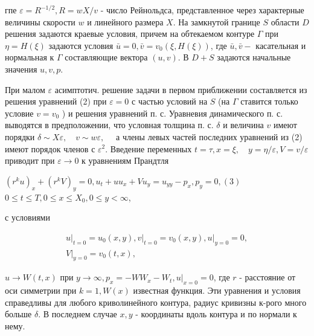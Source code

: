 \documentclass[10pt]{article}
\begin{document}
гпе $\varepsilon=R^{-1 / 2}, R=w X / v$ - число Рейнольдса, представленное через характерные величины скорости $w$ и линейного размера $X$. На замкнутой границе $S$ области $D$ решения задаются краевые условия, причем на обтекаемом контуре $\Gamma$ при $\eta=H(\xi)$ задаются условия $\bar{u}=0, \bar{v}=v_{0}(\xi, H(\xi))$, где $\bar{u}, \bar{v}-$ касательная и нормальная к $\Gamma$ составляющие вектора $(u, v)$. В $D+S$ задаются начальные значения $u, v, p$.



При малом $\varepsilon$ асимптотич. решение задачи в первом приближении составляется из решения уравнений (2) при $\varepsilon=0$ с частью условий на $S$ (на $\Gamma$ ставится только условие $v=v_{0}$ ) и решения уравнений п. с. Уравневия динамического п. с. выводятся в предположении, что условная толщина п. с. $\delta$ и величина $v$ имеют порядки $\delta \sim X \varepsilon, \quad v \sim w \varepsilon, \quad$ а члены левых частей последних уравнений из (2) имеют порядок членов с $\varepsilon^{2}$. Введение переменных $t=\tau, x=\xi, \quad y=\eta / \varepsilon, V=v / \varepsilon$ приводит при $\varepsilon \rightarrow 0$ к уравнениям Прандтля



$\left(r^{k} u\right)_{x}+\left(r^{k} V\right)_{y}=0, u_{t}+u u_{x}+V u_{y}=u_{y y}-p_{x}, p_{y}=0,(3)$ $0 \leqslant t \leqslant T, 0 \leqslant x \leqslant X_{0}, 0 \leqslant y<\infty$,



с условиями



\[

\begin{gathered}

\left.u\right|_{t=0}=u_{0}(x, y),\left.v\right|_{t=0}=v_{0}(x, y),\left.u\right|_{y=0}=0, \\

\left.V\right|_{y=0}=v_{0}(t, x),

\end{gathered}

\]



$u \rightarrow W(t, x)$ при $y \rightarrow \infty, p_{x}=-W W_{x}-W_{t},\left.u\right|_{x=0}=0$, где $r$ - расстояние от оси симметрии при $k=1, W(x)$ известная функция. Эти уравнения и условия справедливы для любого криволинейного контура, радиус кривизны к-рого много больше $\delta$. В последнем случае $x, y$ - координаты вдоль контура и по нормали к нему.
\end{document}
